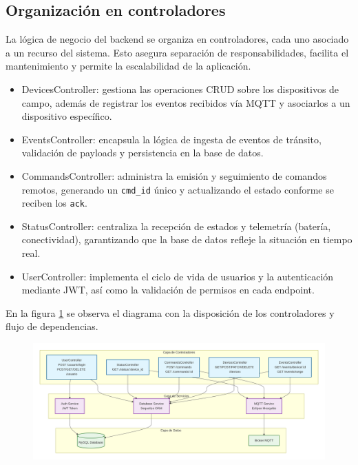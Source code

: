 \subsection{Organización en controladores}

La lógica de negocio del backend se organiza en controladores, cada uno asociado a un recurso del sistema. Esto asegura separación de responsabilidades, facilita el mantenimiento y permite la escalabilidad de la aplicación.

\begin{itemize}
  \item DevicesController: gestiona las operaciones CRUD sobre los dispositivos de campo, además de registrar los eventos recibidos vía MQTT y asociarlos a un dispositivo específico.
  \item EventsController: encapsula la lógica de ingesta de eventos de tránsito, validación de payloads y persistencia en la base de datos.
  \item CommandsController: administra la emisión y seguimiento de comandos remotos, generando un \texttt{cmd\_id} único y actualizando el estado conforme se reciben los \texttt{ack}.
  \item StatusController: centraliza la recepción de estados y telemetría (batería, conectividad), garantizando que la base de datos refleje la situación en tiempo real.
  \item UserController: implementa el ciclo de vida de usuarios y la autenticación mediante JWT, así como la validación de permisos en cada endpoint.
\end{itemize}

En la figura \ref{fig:diagrama_controladores} se observa el diagrama con la disposición de los controladores y flujo de dependencias.

\begin{figure}[htbp]
 
  \centering
  \includegraphics[width=1\linewidth]{./Figures/diagDispoControlladores.png}
  \label{fig:diagrama_controladores}
  \end{figure}


